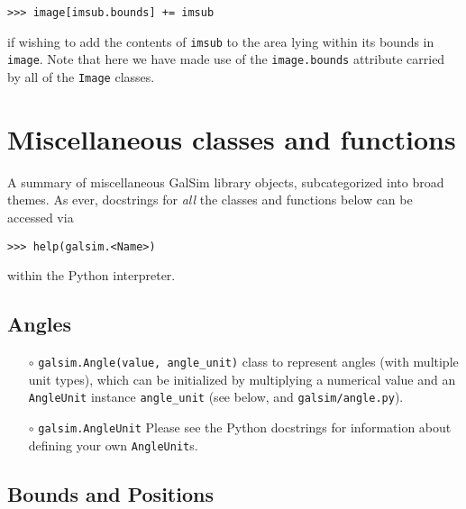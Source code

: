 \documentclass[preprint,11pt]{../../devel/modules/aastex}
\begin{document}
{\tt >>> image[imsub.bounds] += imsub}

if wishing to add the contents of \texttt{imsub} to the area lying
within its bounds in \texttt{image}.  Note that here we have made use of
the \texttt{image.bounds} attribute carried by all of the \texttt{Image}
classes.

\section{Miscellaneous classes and functions}\label{sect:misc}

A summary of miscellaneous GalSim library objects, subcategorized into
broad themes.  As ever, docstrings for \emph{all} the classes and
functions below can be accessed via

{\tt >>> help(galsim.<Name>)}

within the Python interpreter.

\subsection{Angles}\label{sect:angles}
\begin{itemize}

\item[$\circ$] \texttt{galsim.Angle(value, angle\_unit)} \newline
  {class to represent angles (with multiple unit types),
    which can be initialized by multiplying a numerical
    value and an \texttt{AngleUnit} instance \texttt{angle\_unit} (see
    below, and \texttt{galsim/angle.py}).}

\item[$\circ$] \texttt{galsim.AngleUnit} 
 Please see the Python docstrings for information about defining your
 own \texttt{AngleUnit}s.
\end{itemize}

\subsection{Bounds and Positions}\label{sect:bounds}
\end{document}
